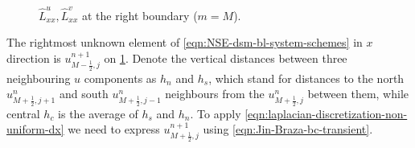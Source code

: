 \documentclass{article}
\numberwithin{equation}{section}
\begin{document}
\begin{figure}[H] %
  \caption{$\hat{L}^u_{xx},\hat{L}^v_{xx}$ at the right boundary ($m=M$).}\label{fig:luxx-right}
\end{figure}
The rightmost unknown element of \cref{eqn:NSE-dsm-bl-system-schemes} in $x$ direction is $u^{n+1}_{M-\frac{1}{2},j}$ on \cref{fig:luxx-right}. Denote the vertical distances between three neighbouring $u$ components as $h_n$ and $h_s$, which stand for distances to the north $u^n_{M+\frac{1}{2},j+1}$ and south $u^{n}_{M+\frac{1}{2},j-1}$ neighbours from the $u^{n}_{M+\frac{1}{2},j}$ between them, while central $h_c$ is the average of $h_s$ and $h_n$.  To apply \cref{eqn:laplacian-discretization-non-uniform-dx} we need to express $u^{n+1}_{M+\frac{1}{2},j}$ using \cref{eqn:Jin-Braza-bc-transient}.
\end{document}
